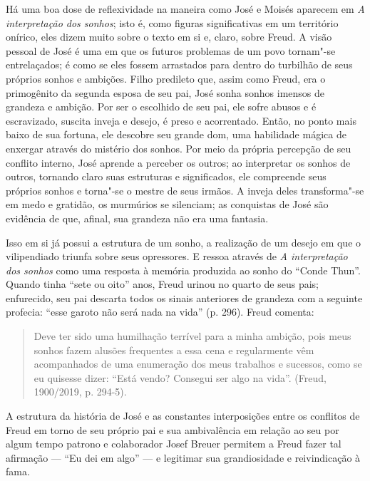 Há uma boa dose de reflexividade na maneira como José e Moisés aparecem
em \emph{A interpretação dos sonhos}; isto é, como figuras
significativas em um território onírico, eles dizem muito sobre o texto
em si e, claro, sobre Freud. A visão pessoal de José é uma em que os
futuros problemas de um povo tornam"-se entrelaçados; é como se eles
fossem arrastados para dentro do turbilhão de seus próprios sonhos e
ambições. Filho predileto que, assim como Freud, era o primogênito da
segunda esposa de seu pai, José sonha sonhos imensos de grandeza e
ambição. Por ser o escolhido de seu pai, ele sofre abusos e é
escravizado, suscita inveja e desejo, é preso e acorrentado. Então, no
ponto mais baixo de sua fortuna, ele descobre seu grande dom, uma
habilidade mágica de enxergar através do mistério dos sonhos. Por meio
da própria percepção de seu conflito interno, José aprende a perceber os
outros; ao interpretar os sonhos de outros, tornando claro suas
estruturas e significados, ele compreende seus próprios sonhos e
torna"-se o mestre de seus irmãos. A inveja deles transforma"-se em medo e
gratidão, os murmúrios se silenciam; as conquistas de José são evidência
de que, afinal, sua grandeza não era uma fantasia.

Isso em si já possui a estrutura de um sonho, a realização de um desejo
em que o vilipendiado triunfa sobre seus opressores. E ressoa através de
\emph{A interpretação dos sonhos} como uma resposta à memória produzida
ao sonho do ``Conde Thun''. Quando tinha ``sete ou oito'' anos, Freud
urinou no quarto de seus pais; enfurecido, seu pai descarta todos os
sinais anteriores de grandeza com a seguinte profecia: ``esse garoto não
será nada na vida'' (p. 296). Freud comenta:

\begin{quote}
Deve ter sido uma humilhação terrível para a minha ambição, pois meus
sonhos fazem alusões frequentes a essa cena e regularmente vêm
acompanhados de uma enumeração dos meus trabalhos e sucessos, como se eu
quisesse dizer: ``Está vendo? Consegui ser algo na vida''. (Freud,
1900/2019, p. 294-5).
\end{quote}

A estrutura da história de José e as constantes interposições entre os
conflitos de Freud em torno de seu próprio pai e sua ambivalência em
relação ao seu por algum tempo patrono e colaborador Josef Breuer
permitem a Freud fazer tal afirmação --- ``Eu dei em algo'' --- e legitimar
sua grandiosidade e reivindicação à fama.

